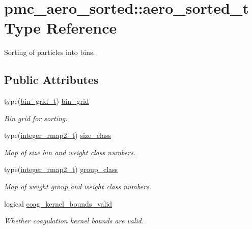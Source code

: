 \hypertarget{structpmc__aero__sorted_1_1aero__sorted__t}{}\section{pmc\+\_\+aero\+\_\+sorted\+:\+:aero\+\_\+sorted\+\_\+t Type Reference}
\label{structpmc__aero__sorted_1_1aero__sorted__t}


Sorting of particles into bins.  


\subsection*{Public Attributes}
\begin{DoxyCompactItemize}
\item 
type(\mbox{\hyperlink{structpmc__bin__grid_1_1bin__grid__t}{bin\+\_\+grid\+\_\+t}}) \mbox{\hyperlink{structpmc__aero__sorted_1_1aero__sorted__t_a24abbe3d25ce85ae642a5b8a7b4fb8c4}{bin\+\_\+grid}}
\begin{DoxyCompactList}\small\item\em Bin grid for sorting. \end{DoxyCompactList}\item 
type(\mbox{\hyperlink{structpmc__integer__rmap2_1_1integer__rmap2__t}{integer\+\_\+rmap2\+\_\+t}}) \mbox{\hyperlink{structpmc__aero__sorted_1_1aero__sorted__t_af5e884a86b1e2bf41ea5a0c148e7e4dc}{size\+\_\+class}}
\begin{DoxyCompactList}\small\item\em Map of size bin and weight class numbers. \end{DoxyCompactList}\item 
type(\mbox{\hyperlink{structpmc__integer__rmap2_1_1integer__rmap2__t}{integer\+\_\+rmap2\+\_\+t}}) \mbox{\hyperlink{structpmc__aero__sorted_1_1aero__sorted__t_ab4759ff075d006823e7f184e75f0ccac}{group\+\_\+class}}
\begin{DoxyCompactList}\small\item\em Map of weight group and weight class numbers. \end{DoxyCompactList}\item 
logical \mbox{\hyperlink{structpmc__aero__sorted_1_1aero__sorted__t_a456b905e4323d7ef610762e6c137d7df}{coag\+\_\+kernel\+\_\+bounds\+\_\+valid}}
\begin{DoxyCompactList}\small\item\em Whether coagulation kernel bounds are valid. \end{DoxyCompactList}\item 

\end{DoxyCompactItemize}
